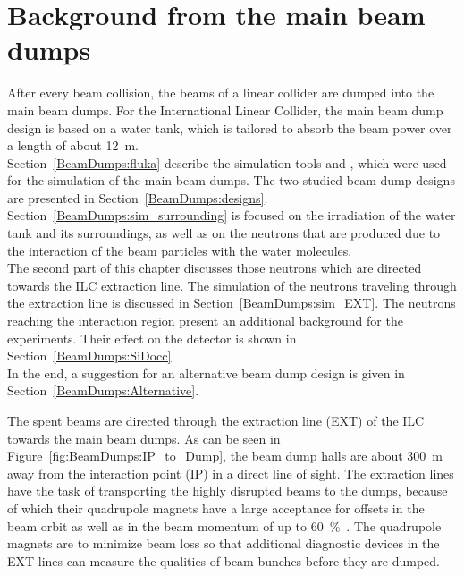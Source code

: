 \chapter{Background from the main beam dumps}
\label{BeamDumps}

\begin{chapterabstract}
 After every beam collision, the beams of a linear collider are dumped into the main beam dumps.
 For the International Linear Collider, the main beam dump design is based on a water tank, which is tailored to absorb the beam power over a length of about \SI[detect-all]{12}{\meter}.
 \\Section~\ref{BeamDumps:fluka} describe the simulation tools \fluka and \flair, which were used for the simulation of the main beam dumps.
 The two studied beam dump designs are presented in Section~\ref{BeamDumps:designs}.
 Section~\ref{BeamDumps:sim_surrounding} is focused on the irradiation of the water tank and its surroundings, as well as on the neutrons that are produced due to the interaction of the beam particles with the water molecules.
 \\The second part of this chapter discusses those neutrons which are directed towards the ILC extraction line.
 The simulation of the neutrons traveling through the extraction line is discussed in Section~\ref{BeamDumps:sim_EXT}.
 The neutrons reaching the interaction region present an additional background for the experiments.
 Their effect on the \sid detector is shown in Section~\ref{BeamDumps:SiDocc}.
 \\In the end, a suggestion for an alternative beam dump design is given in Section~\ref{BeamDumps:Alternative}.
\end{chapterabstract}
\vspace*{0.5cm}\newline
\noindent
The spent \positron\electron beams are directed through the extraction line (EXT) of the ILC towards the main beam dumps. 
As can be seen in Figure~\ref{fig:BeamDumps:IP_to_Dump}, the beam dump halls are about \SI{300}{\meter} away from the interaction point (IP) in a direct line of sight.
The extraction lines have the task of transporting the highly disrupted beams to the dumps, because of which their quadrupole magnets have a large acceptance for offsets in the beam orbit as well as in the beam momentum of up to \SI{60}{\percent}~\cite[p. 139]{TDR32}.
The quadrupole magnets are to minimize beam loss so that additional diagnostic devices in the EXT lines can measure the qualities of beam bunches before they are dumped.
